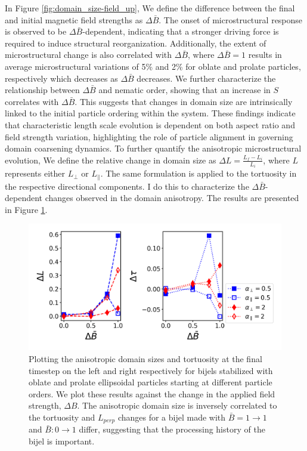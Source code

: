 In Figure \ref{fig:domain_size-field_up}, We define the difference
between the final and initial magnetic field strengths as
$\Delta \bar{B}$. The onset of microstructural response is observed to
be $\Delta \bar{B}$-dependent, indicating that a stronger driving
force is required to induce structural reorganization. Additionally, the
extent of microstructural change is also correlated with
$\Delta \bar{B}$, where $\Delta \bar{B} = 1$ results in average
microstructural variations of 5\% and 2\% for oblate and prolate
particles, respectively which decreases as $\Delta \bar{B}$ decreases.
We further characterize the relationship between $\Delta \bar{B}$ and
nematic order, showing that an increase in \(S\) correlates with
$\Delta \bar{B}$. This suggests that changes in domain size are
intrinsically linked to the initial particle ordering within the system.
These findings indicate that characteristic length scale evolution is
dependent on both aspect ratio and field strength variation,
highlighting the role of particle alignment in governing domain
coarsening dynamics. To further quantify the anisotropic microstructural
evolution, We define the relative change in domain size as
$\Delta L = \frac{L_{f} - L_{i}}{L_{i}}$, where $L$ represents
either $L_{\perp}$ or $L_{\parallel}$. The same formulation is
applied to the tortuosity in the respective directional components. I
do this to characterize the $\Delta \bar{B}$-dependent changes
observed in the domain anisotropy. The results are presented in Figure
\ref{fig:domain_size_aniso-field_up}.

\begin{figure} 
\centering 
\includegraphics[scale = 0.5]{../figures/results/paper2/domain_size_aniso-field_up.png} 
\caption{Plotting the anisotropic domain sizes and tortuosity at the final timestep on the left and right respectively for bijels stabilized with 
         oblate and prolate ellipsoidal particles starting at different particle orders. We plot these results against the change in the applied field 
         strength, $\Delta B$. The anisotropic domain size is inversely correlated to the tortuosity and $L_{perp}$ changes for 
         a bijel made with $\bar{B} = 1 \rightarrow 1$ and $\bar{B}: 0 \rightarrow 1$ differ, suggesting that the processing history of the bijel is important.} 
\label{fig:domain_size_aniso-field_up} 
\end{figure}

